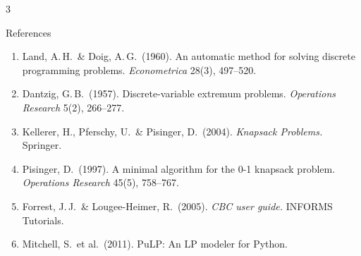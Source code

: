 \documentclass[a0,portrait]{a0poster}
\begin{document}
\begin{multicols}{3}
\begin{posterblock}{References}
\scriptsize
\begin{enumerate}[leftmargin=1.4em,itemsep=1pt,topsep=2pt]
  \item Land, A.\,H.\ \& Doig, A.\,G.\ (1960). An automatic method for solving discrete programming problems. \textit{Econometrica} 28(3), 497--520.
  \item Dantzig, G.\,B.\ (1957). Discrete-variable extremum problems. \textit{Operations Research} 5(2), 266--277.
  \item Kellerer, H., Pferschy, U.\ \& Pisinger, D.\ (2004). \textit{Knapsack Problems.} Springer.
  \item Pisinger, D.\ (1997). A minimal algorithm for the 0-1 knapsack problem. \textit{Operations Research} 45(5), 758--767.
  \item Forrest, J.\,J.\ \& Lougee-Heimer, R.\ (2005). \textit{CBC user guide.} INFORMS Tutorials.
  \item Mitchell, S.\ et al.\ (2011). PuLP: An LP modeler for Python.
\end{enumerate}
\end{posterblock}

\end{multicols}
\end{document}
